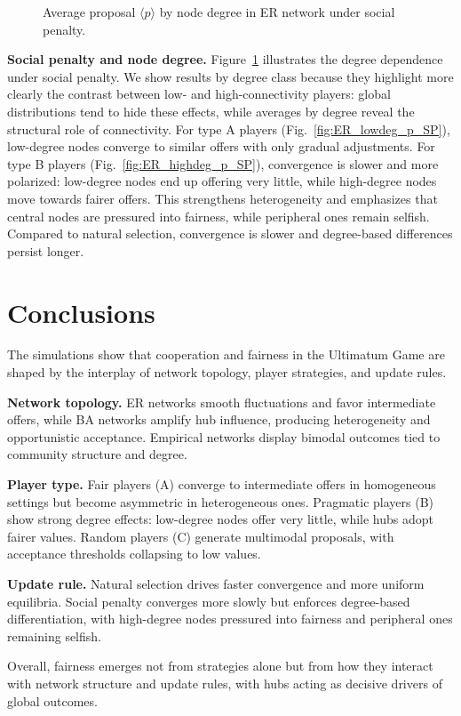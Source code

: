 \begin{figure}[h!]
\begin{minipage}[t]{0.48\textwidth}
        \label{fig:ER_highdeg_p_SP}
    \end{minipage}
    \caption{Average proposal $\langle p \rangle$ by node degree in ER network under social penalty.}
    \label{fig:ER_p_by_degree_SP}
\end{figure}

\textbf{Social penalty and node degree.}  
Figure~\ref{fig:ER_p_by_degree_SP} illustrates the degree dependence under
social penalty. We show results by degree class because they highlight more
clearly the contrast between low- and high-connectivity players: global
distributions tend to hide these effects, while averages by degree reveal the
structural role of connectivity.  
For type A players (Fig.~\ref{fig:ER_lowdeg_p_SP}), low-degree nodes converge to
similar offers with only gradual adjustments.  
For type B players (Fig.~\ref{fig:ER_highdeg_p_SP}), convergence is slower and
more polarized: low-degree nodes end up offering very little, while high-degree
nodes move towards fairer offers.  
This strengthens heterogeneity and emphasizes that central nodes are pressured
into fairness, while peripheral ones remain selfish. Compared to natural
selection, convergence is slower and degree-based differences persist longer.



\section{Conclusions}

The simulations show that cooperation and fairness in the Ultimatum Game are
shaped by the interplay of network topology, player strategies, and update
rules.

\medskip
\noindent\textbf{Network topology.}  
ER networks smooth fluctuations and favor intermediate offers, while BA networks
amplify hub influence, producing heterogeneity and opportunistic acceptance.
Empirical networks display bimodal outcomes tied to community structure and
degree.

\medskip
\noindent\textbf{Player type.}  
Fair players (A) converge to intermediate offers in homogeneous settings but
become asymmetric in heterogeneous ones.  
Pragmatic players (B) show strong degree effects: low-degree nodes offer very
little, while hubs adopt fairer values.  
Random players (C) generate multimodal proposals, with acceptance thresholds
collapsing to low values.

\medskip
\noindent\textbf{Update rule.}  
Natural selection drives faster convergence and more uniform equilibria.  
Social penalty converges more slowly but enforces degree-based differentiation,
with high-degree nodes pressured into fairness and peripheral ones remaining
selfish.

\medskip
Overall, fairness emerges not from strategies alone but from how they interact
with network structure and update rules, with hubs acting as decisive drivers of
global outcomes.

\newpage